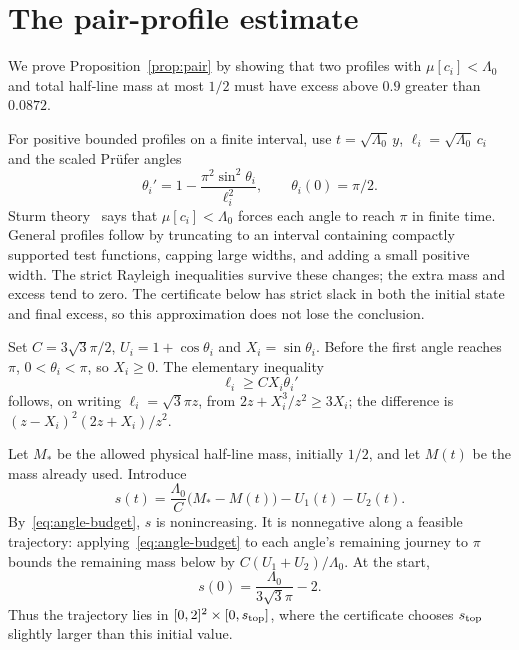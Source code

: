\section{The pair-profile estimate}\label{sec:two}
We prove Proposition~\ref{prop:pair} by showing that two profiles with $\mu[c_i]<\Lambda_0$ and total half-line mass at most $1/2$ must have excess above $0.9$ greater than $0.0872$.

For positive bounded profiles on a finite interval, use $t=\sqrt{\Lambda_0}\,y$, $\ell_i=\sqrt{\Lambda_0}\,c_i$ and the scaled Pr\"ufer angles
\[
 \theta_i'=1-\frac{\pi^2\sin^2\theta_i}{\ell_i^2},\qquad \theta_i(0)=\pi/2.
\]
Sturm theory~\cite{Zettl} says that $\mu[c_i]<\Lambda_0$ forces each angle to reach $\pi$ in finite time. General profiles follow by truncating to an interval containing compactly supported test functions, capping large widths, and adding a small positive width. The strict Rayleigh inequalities survive these changes; the extra mass and excess tend to zero. The certificate below has strict slack in both the initial state and final excess, so this approximation does not lose the conclusion.

Set $C=3\sqrt3\pi/2$, $U_i=1+\cos\theta_i$ and $X_i=\sin\theta_i$. Before the first angle reaches $\pi$, $0<\theta_i<\pi$, so $X_i\ge0$. The elementary inequality
\begin{equation}\label{eq:angle-budget}
 \ell_i\ge C X_i\theta_i'
\end{equation}
follows, on writing $\ell_i=\sqrt3\pi z$, from $2z+X_i^3/z^2\ge3X_i$; the difference is $(z-X_i)^2(2z+X_i)/z^2$.

Let $M_*$ be the allowed physical half-line mass, initially $1/2$, and let $M(t)$ be the mass already used. Introduce
\[
 s(t)=\frac{\Lambda_0}{C}\bigl(M_*-M(t)\bigr)-U_1(t)-U_2(t).
\]
By~\eqref{eq:angle-budget}, $s$ is nonincreasing. It is nonnegative along a feasible trajectory: applying~\eqref{eq:angle-budget} to each angle's remaining journey to $\pi$ bounds the remaining mass below by $C(U_1+U_2)/\Lambda_0$. At the start,
\[
 s(0)=\frac{\Lambda_0}{3\sqrt3\pi}-2.
\]
Thus the trajectory lies in $[0,2]^2\times[0,s_{\rm top}]$, where the certificate chooses $s_{\rm top}$ slightly larger than this initial value.

